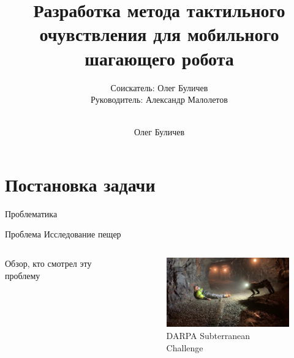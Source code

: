 \documentclass[aspectratio=169,xcolor=table,10pt]{beamer}
\title[]{Разработка метода тактильного очувствления для мобильного шагающего робота} %
\subtitle{Соискатель: Олег Буличев \\ Руководитель: Александр Малолетов \\ \ } %
\author{Олег Буличев}
\newcommand{\fbckg}[1]{\usebackgroundtemplate{\texttt{[image: \#1]}}}%
\begin{document}
\setlength{\abovedisplayskip}{0pt}
\setlength{\belowdisplayskip}{0pt}
\setlength{\abovedisplayshortskip}{0pt}
\setlength{\belowdisplayshortskip}{0pt}

\fbckg{fibeamer/figs/title_page.png}

\fbckg{fibeamer/figs/common.png}

\section{Постановка задачи}

\begin{frame}[t]{Проблематика}
    \begin{block}{Проблема}
        Исследование пещер
    \end{block}
    \begin{columns}[T,onlytextwidth]
        \begin{column}{0.59\textwidth}
            Обзор, кто смотрел эту проблему
        \end{column}
        \begin{column}{0.39\textwidth}
            \begin{figure}[H]
                \centering\includegraphics[height=3cm,width=1\textwidth,keepaspectratio]{open_cave.jpg}
                \caption*{DARPA Subterranean Challenge}
                \label{fig:open_cave.jpg}
            \end{figure}
        \end{column}
    \end{columns}
\end{frame}
\end{document}
